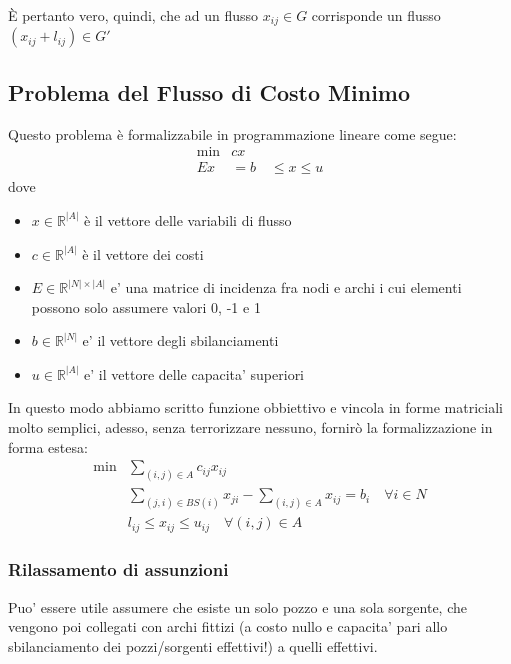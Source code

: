 È pertanto vero, quindi, che ad un flusso $x_{ij} \in G $ corrisponde un flusso $(x_{ij}+l_{ij}) \in G'$
\subsection{Problema del Flusso di Costo Minimo}


Questo problema è formalizzabile in programmazione lineare come segue:
\begin{equation}
  \begin{aligned}
    \min &cx\\ 
    Ex &= b \quad \leq x \leq u  
  \end{aligned}
\end{equation}
dove

\begin{itemize}
  \item $x \in \mathbb{R}^{|A|} $ è il vettore delle variabili di flusso
  \item $c \in \mathbb{R}^{|A|} $ è il vettore dei costi
  \item $E \in \mathbb{R} ^{|N| \times |A|} $ e' una matrice di incidenza fra nodi e archi i cui elementi possono solo assumere valori 0, -1 e 1
  \item $b \in \mathbb{R}^{|N|} $ e' il vettore degli sbilanciamenti
  \item $u \in \mathbb{R}^{|A|}$ e' il vettore delle capacita' superiori
\end{itemize}

In questo modo abbiamo scritto funzione obbiettivo e vincola in forme matriciali molto semplici, adesso, senza terrorizzare nessuno, fornirò la formalizzazione in forma estesa:
\begin{equation}
  \begin{aligned}
    \min &\sum_{(i,j) \in A} c_{ij}x_{ij}\\
    &\sum_{(j,i)\in BS(i)}x_{ji} -\sum_{(i,j) \in A} x_{ij} = b_i \quad \forall i \in N\\
    &l_{ij} \leq x_{ij} \leq u_{ij} \quad \forall (i,j) \in A
  \end{aligned}
\end{equation}

\subsubsection{Rilassamento di assunzioni}
Puo' essere utile assumere che esiste un solo pozzo e una sola sorgente, che vengono poi collegati con archi fittizi (a costo nullo e capacita' pari allo sbilanciamento dei pozzi/sorgenti effettivi!) a quelli effettivi. 


